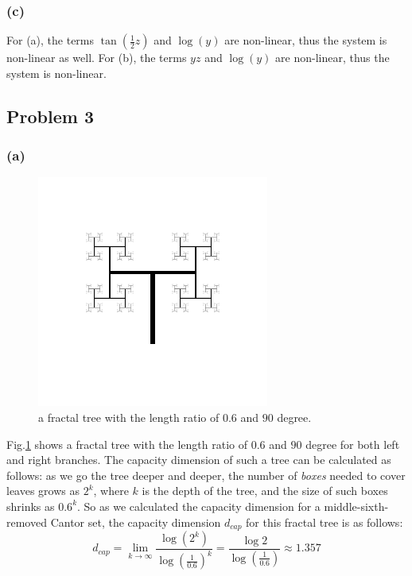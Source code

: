 \documentclass{article}
\begin{document}
\subsubsection*{(c)}
For (a), the terms $\tan\left( \frac{1}{2}z\right)$ and $\log(y)$ are non-linear, thus the system is non-linear as well. For (b), the terms $yz$ and $\log(y)$ are non-linear, thus the system is non-linear.

\subsection*{Problem 3}
\subsubsection*{(a)}
\begin{figure}[hb]
	\centering
	\includegraphics[height=3in]{figs/fractal-tree_06.png}
	\caption{a fractal tree with the length ratio of $0.6$ and $90$ degree.}
	\label{fractal_tree1}
\end{figure}

Fig.\ref{fractal_tree1} shows a fractal tree with the length ratio of $0.6$ and $90$ degree for both left and right branches. The capacity dimension of such a tree can be calculated as follows: as we go the tree deeper and deeper, the number of \textit{boxes} needed to cover leaves grows as $2^k$, where $k$ is the depth of the tree, and the size of such boxes shrinks as $0.6^k$. So as we calculated the capacity dimension for a middle-sixth-removed Cantor set, the capacity dimension $d_{cap}$ for this fractal tree is as follows:
\[
	d_{cap} = \lim_{k  \to \infty}\frac{\log(2^k)}{\log\left( \frac{1}{0.6} \right)^k} = \frac{\log2}{\log\left( \frac{1}{0.6} \right)} \approx 1.357
\]
\end{document}
